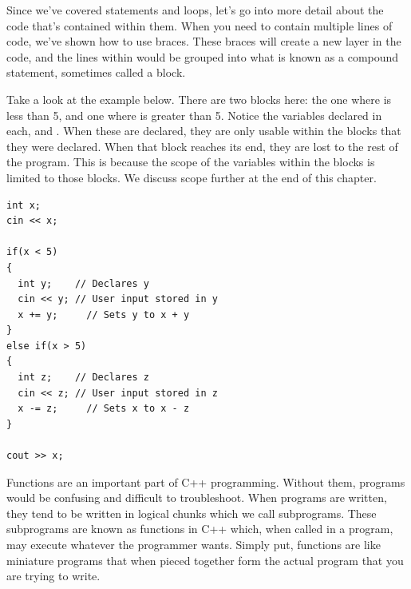

Since we've covered  statements and loops, let's go into more detail about the code that's contained within them. 
When you need to contain multiple lines of code, we've shown how to use braces. 
These braces will create a new layer in the code, and the lines within would be grouped into what is known as a compound statement, sometimes called a block.

Take a look at the example below. 
There are two blocks here: the one where  is less than 5, and one where  is greater than 5. 
Notice the variables declared in each,  and . 
When these are declared, they are only usable within the blocks that they were declared. 
When that block reaches its end, they are lost to the rest of the program. 
This is because the scope of the variables within the blocks is limited to those blocks.
We discuss scope further at the end of this chapter.

\noindent\begin{minipage}{\linewidth}\begin{lstlisting}
int x;
cin << x;

if(x < 5)
{
  int y;    // Declares y
  cin << y;	// User input stored in y
  x += y;	  // Sets y to x + y
}
else if(x > 5)
{
  int z;    // Declares z
  cin << z; // User input stored in z
  x -= z;	  // Sets x to x - z
}

cout >> x;
\end{lstlisting}\end{minipage}

 
 
Functions are an important part of C++ programming. 
Without them, programs would be confusing and difficult to troubleshoot. 
When programs are written, they tend to be written in logical chunks which we call subprograms. 
These subprograms are known as functions in C++ which, when called in a program, may execute whatever the programmer wants. 
Simply put, functions are like miniature programs that when pieced together form the actual program that you are trying to write.
 
 

